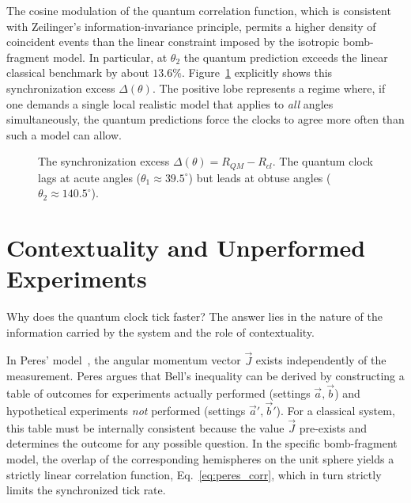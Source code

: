 \documentclass[entropy,article,submit,moreauthors,pdftex]{Definitions/mdpi}
\begin{document}
The cosine modulation of the quantum correlation function, which is consistent with Zeilinger's information-invariance principle, permits a higher density of coincident events than the linear constraint imposed by the isotropic bomb-fragment model. In particular, at $\theta_2$ the quantum prediction exceeds the linear classical benchmark by about $13.6\%$.
Figure~\ref{fig:delta} explicitly shows this synchronization excess $\Delta(\theta)$. The positive lobe represents a regime where, if one demands a single local realistic model that applies to \emph{all} angles simultaneously, the quantum predictions force the clocks to agree more often than such a model can allow.

\begin{figure}[t]
\centering
{}
\caption{The synchronization excess $\Delta(\theta) = R_{QM} - R_{cl}$. The quantum clock lags at acute angles ($\theta_1 \approx 39.5^\circ$) but leads at obtuse angles ($\theta_2 \approx 140.5^\circ$).}
\label{fig:delta}
\end{figure}

\section{Contextuality and Unperformed Experiments}

Why does the quantum clock tick faster? The answer lies in the nature of the information carried by the system and the role of contextuality.

In Peres' model~\cite{peres222}, the angular momentum vector $\vec{J}$ exists independently of the measurement. Peres argues that Bell's inequality can be derived by constructing a table of outcomes for experiments actually performed (settings $\vec{a}, \vec{b}$) and hypothetical experiments \emph{not} performed (settings $\vec{a}', \vec{b}'$). For a classical system, this table must be internally consistent because the value $\vec{J}$ pre-exists and determines the outcome for any possible question. In the specific bomb-fragment model, the overlap of the corresponding hemispheres on the unit sphere yields a strictly linear correlation function, Eq.~\eqref{eq:peres_corr}, which in turn strictly limits the synchronized tick rate.
\end{document}
